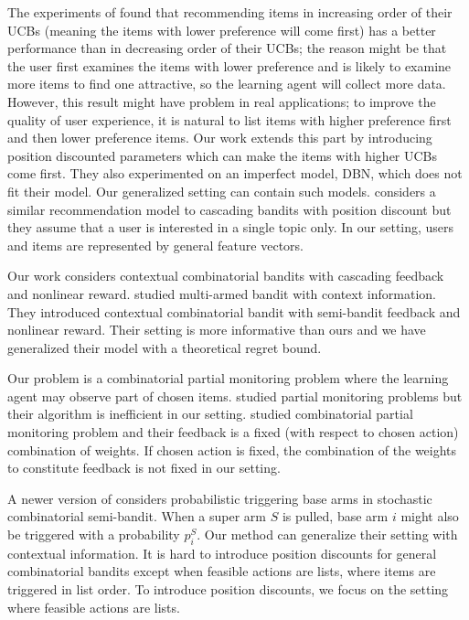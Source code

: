 \documentclass{article}
\begin{document}
The experiments of \cite{kveton2015cascading} found that recommending items in increasing order of their UCBs (meaning the items with lower preference will come first) has a better performance than in decreasing order of their UCBs; the reason might be that the user first examines the items with lower preference and is likely to examine more items to find one attractive, so the learning agent will collect more data. However, this result might have problem in real applications; to improve the quality of user experience, it is natural to list items with higher preference first and then lower preference items. Our work extends this part by introducing position discounted parameters which can make the items with higher UCBs come first. They also experimented on an imperfect model, DBN, which does not fit their model. Our generalized setting can contain such models. \cite{combes2015learning} considers a similar recommendation model to cascading bandits with position discount but they assume that a user is interested in a single topic only. In our setting, users and items are represented by general feature vectors.

Our work considers contextual combinatorial bandits with cascading feedback and nonlinear reward. \cite{li2010contextual} studied multi-armed bandit with context information. They introduced contextual combinatorial bandit with semi-bandit feedback and nonlinear reward. Their setting is more informative than ours and we have generalized their model with a theoretical regret bound.

Our problem is a combinatorial partial monitoring problem where the learning agent may observe part of chosen items. \cite{agrawal1989asymptotically,bartok2012adaptive} studied partial monitoring problems but their algorithm is inefficient in our setting. \cite{lin2014combinatorial} studied combinatorial partial monitoring problem and their feedback is a fixed (with respect to chosen action) combination of weights. If chosen action is fixed, the combination of the weights to constitute feedback is not fixed in our setting.

A newer version of \cite{chen2013combinatorial} considers probabilistic triggering base arms in stochastic combinatorial semi-bandit. When a super arm $S$ is pulled, base arm $i$ might also be triggered with a probability $p_i^{S}$. Our method can generalize their setting with contextual information. It is hard to introduce position discounts for general combinatorial bandits except when feasible actions are lists, where items are triggered in list order. To introduce position discounts, we focus on the setting where feasible actions are lists.
\end{document}

